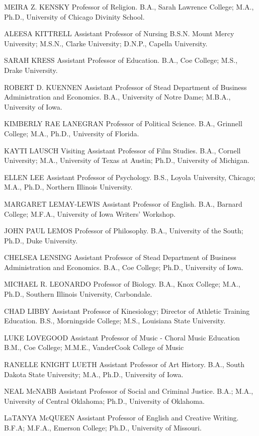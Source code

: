 \documentclass[
  letterpaper,
]{scrbook}
\begin{document}
MEIRA Z. KENSKY Professor of Religion. B.A., Sarah Lawrence College;
M.A., Ph.D., University of Chicago Divinity School.

ALEESA KITTRELL Assistant Professor of Nursing B.S.N. Mount Mercy
University; M.S.N., Clarke University; D.N.P., Capella University.

SARAH KRESS Assistant Professor of Education. B.A., Coe College; M.S.,
Drake University.

ROBERT D. KUENNEN Assistant Professor of Stead Department of Business
Administration and Economics. B.A., University of Notre Dame; M.B.A.,
University of Iowa.

KIMBERLY RAE LANEGRAN Professor of Political Science. B.A., Grinnell
College; M.A., Ph.D., University of Florida.

KAYTI LAUSCH Visiting Assistant Professor of Film Studies. B.A., Cornell
University; M.A., University of Texas at Austin; Ph.D., University of
Michigan.

ELLEN LEE Assistant Professor of Psychology. B.S., Loyola University,
Chicago; M.A., Ph.D., Northern Illinois University.

MARGARET LEMAY-LEWIS Assistant Professor of English. B.A., Barnard
College; M.F.A., University of Iowa Writers' Workshop.

JOHN PAUL LEMOS Professor of Philosophy. B.A., University of the South;
Ph.D., Duke University.

CHELSEA LENSING Assistant Professor of Stead Department of Business
Administration and Economics. B.A., Coe College; Ph.D., University of
Iowa.

MICHAEL R. LEONARDO Professor of Biology. B.A., Knox College; M.A.,
Ph.D., Southern Illinois University, Carbondale.

CHAD LIBBY Assistant Professor of Kinesiology; Director of Athletic
Training Education. B.S., Morningside College; M.S., Louisiana State
University.

LUKE LOVEGOOD Assistant Professor of Music - Choral Music Education
B.M., Coe College; M.M.E., VanderCook College of Music

RANELLE KNIGHT LUETH Assistant Professor of Art History. B.A., South
Dakota State University; M.A., Ph.D., University of Iowa.

NEAL McNABB Assistant Professor of Social and Criminal Justice. B.A.;
M.A., University of Central Oklahoma; Ph.D., University of Oklahoma.

LaTANYA McQUEEN Assistant Professor of English and Creative Writing.
B.F.A; M.F.A., Emerson College; Ph.D., University of Missouri.
\end{document}
